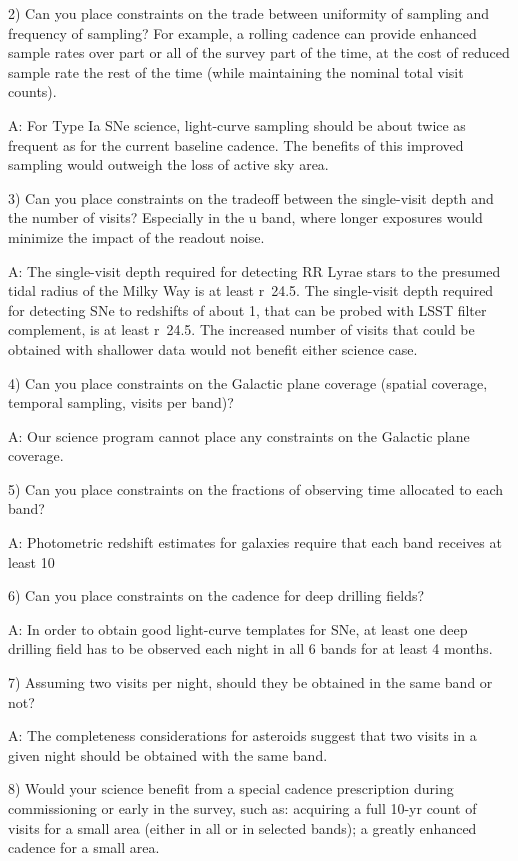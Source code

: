 2) Can you place constraints on the trade between uniformity of sampling and frequency of
sampling? For example, a rolling cadence can provide enhanced sample rates over part or all
of the survey part of the time, at the cost of reduced sample rate the rest of the time (while
maintaining the nominal total visit counts).

A: For Type Ia SNe science, light-curve sampling should be about twice as frequent as
for the current baseline cadence. The benefits of this improved sampling would outweigh
the loss of active sky area.

3) Can you place constraints on the tradeoff between the single-visit depth and the number
of visits? Especially in the u band, where longer exposures would minimize the impact of the
readout noise.

A: The single-visit depth required for detecting RR Lyrae stars to the presumed tidal radius
of the Milky Way is at least r~24.5. The single-visit depth required for detecting SNe to redshifts
of about 1, that can be probed with LSST filter complement, is at least r~24.5. The increased
number of visits that could be obtained with shallower data would not benefit either science
case.

4) Can you place constraints on the Galactic plane coverage (spatial coverage, temporal
sampling, visits per band)?

A: Our science program cannot place any constraints on the Galactic plane coverage.

5) Can you place constraints on the fractions of observing time allocated to each band?

A: Photometric redshift estimates for galaxies require that each band receives at least
10%

6) Can you place constraints on the cadence for deep drilling fields?

A: In order to obtain good light-curve templates for SNe, at least one deep drilling field
has to be observed each night in all 6 bands for at least 4 months.

7) Assuming two visits per night, should they be obtained in the same band or not?

A: The completeness considerations for asteroids suggest that two visits in a given
night should be obtained with the same band.

8) Would your science benefit from a special cadence prescription during commissioning or
early in the survey, such as: acquiring a full 10-yr count of visits for a small area (either in
all or in selected bands); a greatly enhanced cadence for a small area.

